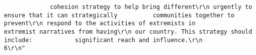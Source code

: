 \documentclass[
]{book}
\begin{document}
\begin{verbatim}
             cohesion strategy to help bring different\r\n urgently to ensure that it can strategically          communities together to prevent\r\n respond to the activities of extremists in            extremist narratives from having\r\n our country. This strategy should include:            significant reach and influence.\r\n                                                   6\r\n"                                                                                                                                                                                                                                                                                                                                                                                                                                                                                                                                                                                                                                                                                                                                                                                                                                                                                                                                                                                                                                                                                                                                                                                                                                                                                                                                                                                                                                                                                                                                                                                                                                                                                                                                                                                                                                                                                                                                                                                                                                                                                                                                                                                                                                                                                                                                                                                              

\end{verbatim}
\end{document}
